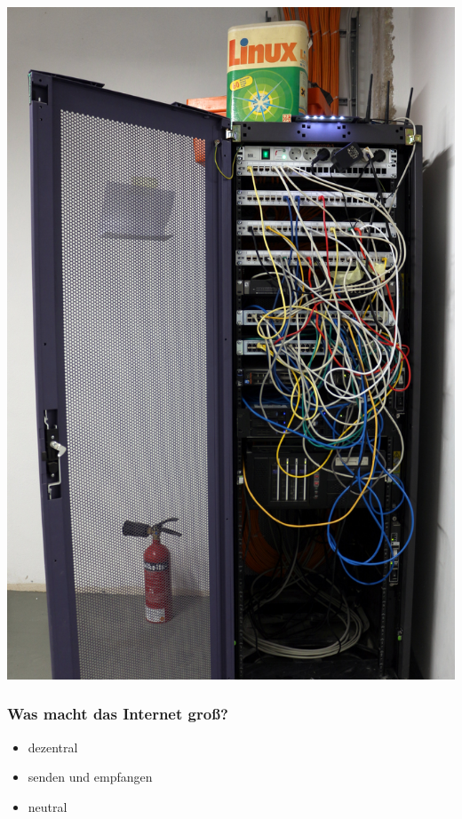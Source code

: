 \documentclass[12pt]{beamer}
\begin{document}
\begin{center}
\begin{frame}
{			\includegraphics[height=0.6\textheight]{img/rack.jpg}
		}
\end{frame}
\end{center}  

\begin{frame}
	\frametitle{Was macht das Internet groß?}
	\begin{itemize}
		\item<1-> dezentral
		\item<2-> senden und empfangen
    \item<3-> neutral
	\end{itemize}
\end{frame}
\end{document}
